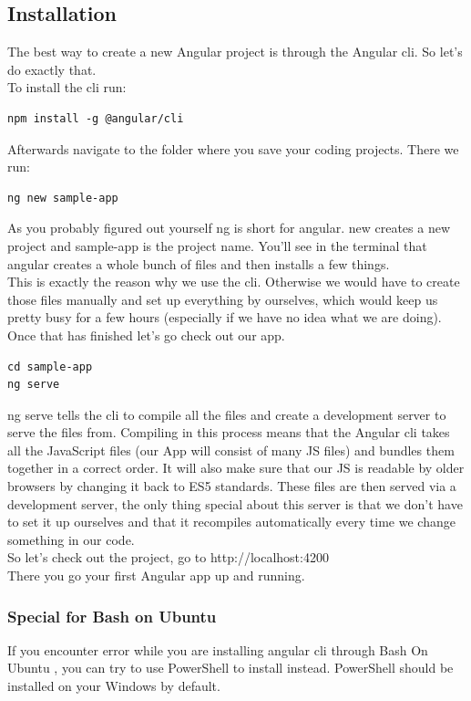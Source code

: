 \documentclass[a4paper]{article}
\begin{document}
\subsection{Installation}
The best way to create a new Angular project is through the Angular cli. So let’s do exactly that.\\

To install the cli run:
\begin{lstlisting}
npm install -g @angular/cli
\end{lstlisting}
Afterwards navigate to the folder where you save your coding projects. There we run:
\begin{lstlisting}
ng new sample-app
\end{lstlisting}
As you probably figured out yourself ng is short for angular. new creates a new project and sample-app is the project name. You’ll see in the terminal that angular creates a whole bunch of files and then installs a few things.\\

This is exactly the reason why we use the cli. Otherwise we would have to create those files manually and set up everything by ourselves, which would keep us pretty busy for a few hours (especially if we have no idea what we are doing).\\

Once that has finished let’s go check out our app.
\begin{lstlisting}
cd sample-app
ng serve
\end{lstlisting}
ng serve tells the cli to compile all the files and create a development server to serve the files from. Compiling in this process means that the Angular cli takes all the JavaScript files (our App will consist of many JS files) and bundles them together in a correct order. It will also make sure that our JS is readable by older browsers by changing it back to ES5 standards. These files are then served via a development server, the only thing special about this server is that we don’t have to set it up ourselves and that it recompiles automatically every time we change something in our code.\\

So let’s check out the project, go to http://localhost:4200\\

There you go your first Angular app up and running.

\subsubsection{Special for Bash on Ubuntu}
If you encounter error while you are installing angular cli through Bash On Ubuntu , you can try to use PowerShell to install instead. PowerShell should be installed on your Windows by default.
\end{document}
